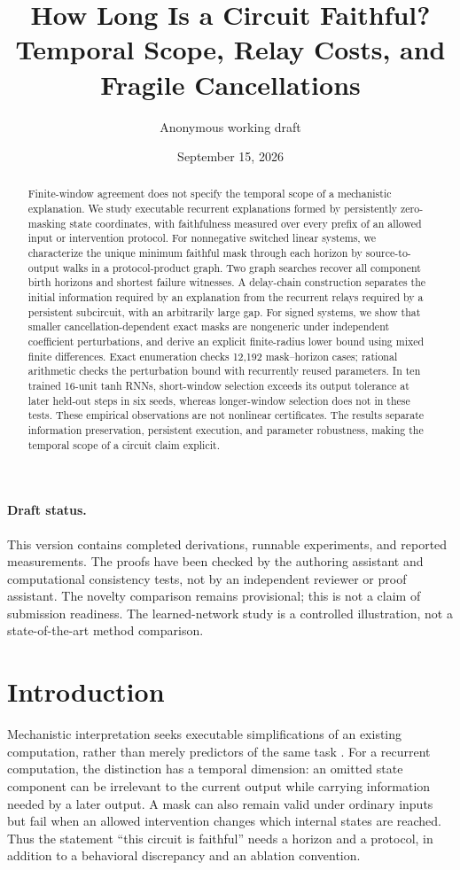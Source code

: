 \documentclass[11pt]{article}
\title{How Long Is a Circuit Faithful?\\Temporal Scope, Relay Costs, and Fragile Cancellations}
\author{Anonymous working draft}
\date{September 15, 2026}
\theoremstyle{definition}\newtheorem{definition}[theorem]{Definition}
\begin{document}
\maketitle
\begin{abstract}
Finite-window agreement does not specify the temporal scope of a mechanistic explanation. We study executable recurrent explanations formed by persistently zero-masking state coordinates, with faithfulness measured over every prefix of an allowed input or intervention protocol. For nonnegative switched linear systems, we characterize the unique minimum faithful mask through each horizon by source-to-output walks in a protocol-product graph. Two graph searches recover all component birth horizons and shortest failure witnesses. A delay-chain construction separates the initial information required by an explanation from the recurrent relays required by a persistent subcircuit, with an arbitrarily large gap. For signed systems, we show that smaller cancellation-dependent exact masks are nongeneric under independent coefficient perturbations, and derive an explicit finite-radius lower bound using mixed finite differences. Exact enumeration checks 12,192 mask--horizon cases; rational arithmetic checks the perturbation bound with recurrently reused parameters. In ten trained 16-unit tanh RNNs, short-window selection exceeds its output tolerance at later held-out steps in six seeds, whereas longer-window selection does not in these tests. These empirical observations are not nonlinear certificates. The results separate information preservation, persistent execution, and parameter robustness, making the temporal scope of a circuit claim explicit.
\end{abstract}

\paragraph{Draft status.} This version contains completed derivations, runnable experiments, and reported measurements. The proofs have been checked by the authoring assistant and computational consistency tests, not by an independent reviewer or proof assistant. The novelty comparison remains provisional; this is not a claim of submission readiness. The learned-network study is a controlled illustration, not a state-of-the-art method comparison.

\section{Introduction}
Mechanistic interpretation seeks executable simplifications of an existing computation, rather than merely predictors of the same task \citep{geiger2025}. For a recurrent computation, the distinction has a temporal dimension: an omitted state component can be irrelevant to the current output while carrying information needed by a later output. A mask can also remain valid under ordinary inputs but fail when an allowed intervention changes which internal states are reached. Thus the statement ``this circuit is faithful'' needs a horizon and a protocol, in addition to a behavioral discrepancy and an ablation convention.
\end{document}
